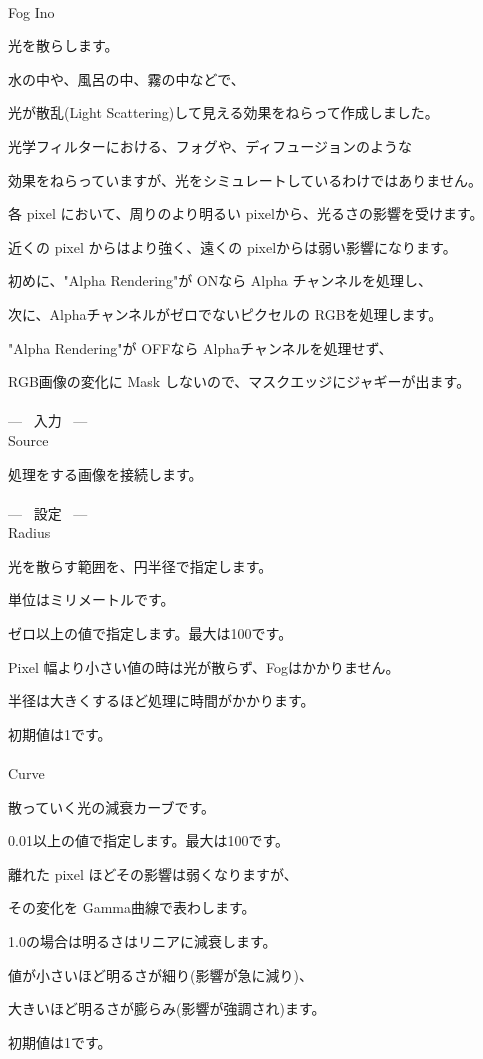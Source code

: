 \documentclass[a4paper,12pt]{article}
\begin{document}
\thispagestyle{empty}

\Large
\noindent \\
Fog Ino\medskip
\par
\normalsize
光を散らします。\\
\par
水の中や、風呂の中、霧の中などで、\par
光が散乱(Light Scattering)して見える効果をねらって作成しました。\par
光学フィルターにおける、フォグや、ディフュージョンのような\par
効果をねらっていますが、光をシミュレートしているわけではありません。\\
\par
各 pixel において、周りのより明るい pixelから、光るさの影響を受けます。\par
近くの pixel からはより強く、遠くの pixelからは弱い影響になります。\\
\par
初めに、"Alpha Rendering"が ONなら Alpha チャンネルを処理し、\par
次に、Alphaチャンネルがゼロでないピクセルの RGBを処理します。\\
\par
"Alpha Rendering"が OFFなら Alphaチャンネルを処理せず、\par
RGB画像の変化に Mask しないので、マスクエッジにジャギーが出ます。\\
\\
--- \ 入力 \ ---\\
Source\par
処理をする画像を接続します。\\
\\
--- \ 設定 \ ---\\
Radius\par
光を散らす範囲を、円半径で指定します。\par
単位はミリメートルです。\par
ゼロ以上の値で指定します。最大は100です。\par
Pixel 幅より小さい値の時は光が散らず、Fogはかかりません。\par
半径は大きくするほど処理に時間がかかります。\par
初期値は1です。\\
\\
Curve\par
散っていく光の減衰カーブです。\par
0.01以上の値で指定します。最大は100です。\par
離れた pixel ほどその影響は弱くなりますが、\par
その変化を Gamma曲線で表わします。\par
1.0の場合は明るさはリニアに減衰します。\par
値が小さいほど明るさが細り(影響が急に減り)、\par
大きいほど明るさが膨らみ(影響が強調され)ます。\par
初期値は1です。
\end{document}
